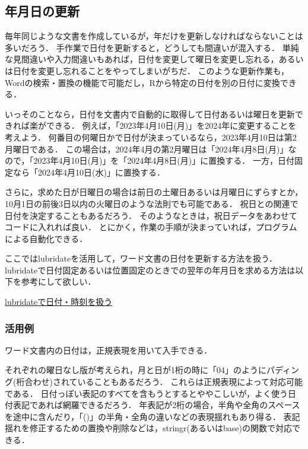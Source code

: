 \documentclass[
]{article}
\begin{document}
\hypertarget{ux5e74ux6708ux65e5ux306eux66f4ux65b0}{%
\subsection{年月日の更新}\label{ux5e74ux6708ux65e5ux306eux66f4ux65b0}}

毎年同じような文書を作成しているが，年だけを更新しなければならないことは多いだろう．
手作業で日付を更新すると，どうしても間違いが混入する．
単純な見間違いや入力間違いもあれば，日付を変更して曜日を変更し忘れる，あるいは日付を変更し忘れることをやってしまいがちだ．
このような更新作業も，Wordの検索・置換の機能で可能だし，Rから特定の日付を別の日付に変換できる．

いっそのことなら，日付を文書内で自動的に取得して日付あるいは曜日を更新できれば楽ができる．
例えば，「2023年4月10日(月)」を2024年に変更することを考えよう．
何番目の何曜日かで日付が決まっているなら，2023年4月10日は第2月曜日である．
この場合は，2024年4月の第2月曜日は「2024年4月8日(月)」なので，「2023年4月10日(月)」を「2024年4月8日(月)」に置換する．
一方，日付固定なら「2024年4月10日(水)」に置換する．

さらに，求めた日が日曜日の場合は前日の土曜日あるいは月曜日にずらすとか，10月1日の前後3日以内の火曜日のような法則でも可能である．
祝日との関連で日付を決定することもあるだろう．
そのようなときは，祝日データをあわせてコードに入れれば良い．
とにかく，作業の手順が決まっていれば，プログラムによる自動化できる．

ここではlubridateを活用して，ワード文書の日付を更新する方法を扱う．
lubridateで日付固定あるいは位置固定のときでの翌年の年月日を求める方法は以下を参考にして欲しい．

\protect\hyperlink{lubridate}{lubridateで日付・時刻を扱う}

\hypertarget{ux6d3bux7528ux4f8b-2}{%
\subsubsection{活用例}\label{ux6d3bux7528ux4f8b-2}}

ワード文書内の日付は，正規表現を用いて入手できる．

それぞれの曜日なし版が考えられ，月と日が1桁の時に「04」のようにパディング(桁合わせ)されていることもあるだろう．
これらは正規表現によって対応可能である．
日付っぽい表記のすべてを含もうとするとややこしいが，よく使う日付表記であれば網羅できるだろう．
年表記が2桁の場合，半角や全角のスペースを途中に含んだり，「()」の半角・全角の違いなどの表現揺れもあり得る．
表記揺れを修正するための置換や削除などは，stringr(あるいはbase)の関数で対応できる．
\end{document}
